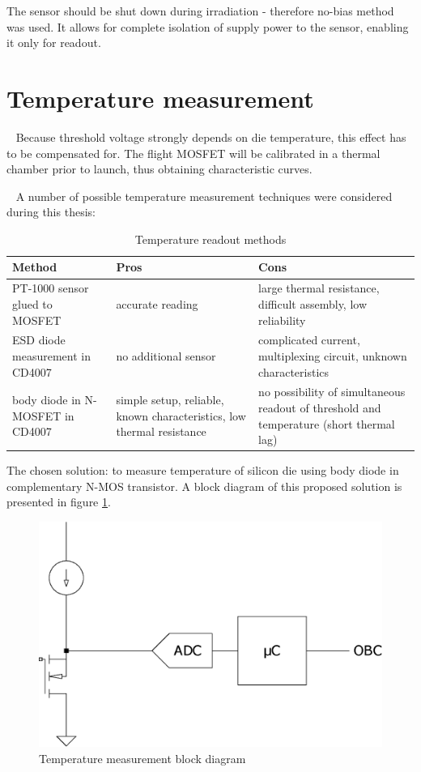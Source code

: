     The sensor should be shut down during irradiation - therefore no-bias method was used. It allows for complete isolation of supply power to the sensor, enabling it only for readout.

\section{Temperature measurement}
    Because threshold voltage strongly depends on die temperature, this effect has to be compensated for. The flight MOSFET will be calibrated in a thermal chamber prior to launch, thus obtaining characteristic curves.

    A number of possible temperature measurement techniques were considered during this thesis:
    \begin{table}[H]
    \begin{tabular}{R{4.5cm} | C{5cm} | C{5cm} }
        Method & Pros & Cons \\ \hline

        PT-1000 sensor glued to MOSFET & accurate reading & large thermal resistance, difficult assembly, low reliability \\ \hline

        ESD diode measurement in CD4007 & no additional sensor & complicated current, multiplexing circuit, unknown characteristics \\ \hline

        body diode in N-MOSFET in CD4007  & simple setup, reliable, known characteristics, low thermal resistance & no possibility of simultaneous readout of threshold and temperature (short thermal lag)
    \end{tabular}
    \caption{Temperature readout methods}
    \end{table}

    The chosen solution: to measure temperature of silicon die using body diode in complementary N-MOS transistor. A block diagram of this proposed solution is presented in figure \ref{Temperature_measurement_block_diagram}.

    \begin{figure}[H]
        \centering
        \includegraphics[width=0.3\paperwidth]{img/05/n-mos-temperature.eps}
        \caption{Temperature measurement block diagram}
        \label{Temperature_measurement_block_diagram}
    \end{figure}

